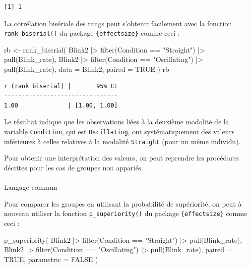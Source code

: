 \documentclass[
  letterpaper,
]{book}
\makeatletter
\let\oldparagraph\paragraph
\renewcommand{\paragraph}{
    \@ifstar
      \xxxParagraphStar
      \xxxParagraphNoStar
  }
\newcommand{\xxxParagraphStar}[1]{\oldparagraph*{#1}\mbox{}}
\newcommand{\xxxParagraphNoStar}[1]{\oldparagraph{#1}\mbox{}}
\newenvironment{Shaded}{\begin{snugshade}}{\end{snugshade}}
\newcommand{\AttributeTok}[1]{\textcolor[rgb]{0.40,0.45,0.13}{#1}}
\newcommand{\ConstantTok}[1]{\textcolor[rgb]{0.56,0.35,0.01}{#1}}
\newcommand{\FunctionTok}[1]{\textcolor[rgb]{0.28,0.35,0.67}{#1}}
\newcommand{\NormalTok}[1]{\textcolor[rgb]{0.00,0.23,0.31}{#1}}
\newcommand{\OtherTok}[1]{\textcolor[rgb]{0.00,0.23,0.31}{#1}}
\newcommand{\SpecialCharTok}[1]{\textcolor[rgb]{0.37,0.37,0.37}{#1}}
\newcommand{\StringTok}[1]{\textcolor[rgb]{0.13,0.47,0.30}{#1}}
\makeatother
\begin{document}
\begin{verbatim}
[1] 1
\end{verbatim}

La corrélation bisériale des rangs peut s'obtenir facilement avec la
fonction \texttt{rank\_biserial()} du package \texttt{\{effectsize\}}
comme ceci :

\begin{Shaded}
\begin{Highlighting}[]
\NormalTok{rb }\OtherTok{\textless{}{-}}
  \FunctionTok{rank\_biserial}\NormalTok{(}
\NormalTok{  Blink2 }\SpecialCharTok{|\textgreater{}} \FunctionTok{filter}\NormalTok{(Condition }\SpecialCharTok{==} \StringTok{"Straight"}\NormalTok{) }\SpecialCharTok{|\textgreater{}} \FunctionTok{pull}\NormalTok{(Blink\_rate),}
\NormalTok{  Blink2 }\SpecialCharTok{|\textgreater{}} \FunctionTok{filter}\NormalTok{(Condition }\SpecialCharTok{==} \StringTok{"Oscillating"}\NormalTok{) }\SpecialCharTok{|\textgreater{}} \FunctionTok{pull}\NormalTok{(Blink\_rate),}
  \AttributeTok{data =}\NormalTok{ Blink2,}
  \AttributeTok{paired =} \ConstantTok{TRUE}
\NormalTok{  )}
\NormalTok{rb}
\end{Highlighting}
\end{Shaded}

\begin{verbatim}
r (rank biserial) |       95% CI
--------------------------------
1.00              | [1.00, 1.00]
\end{verbatim}

Le résultat indique que les observations liées à la deuxième modalité de
la variable \texttt{Condition}, qui est \texttt{Oscillating}, ont
systématiquement des valeurs inférieures à celles relatives à la
modalité \texttt{Straight} (pour un même individu).

Pour obtenir une interprétation des valeurs, on peut reprendre les
procédures décrites pour les cas de groupes non appariés.

\paragraph{Langage commun}\label{langage-commun-2}

Pour comparer les groupes en utilisant la probabilité de supériorité, on
peut à nouveau utiliser la fonction \texttt{p\_superiority()} du package
\texttt{\{effectsize\}} comme ceci :

\begin{Shaded}
\begin{Highlighting}[]
\FunctionTok{p\_superiority}\NormalTok{(}
\NormalTok{  Blink2 }\SpecialCharTok{|\textgreater{}} \FunctionTok{filter}\NormalTok{(Condition }\SpecialCharTok{==} \StringTok{"Straight"}\NormalTok{) }\SpecialCharTok{|\textgreater{}} \FunctionTok{pull}\NormalTok{(Blink\_rate),}
\NormalTok{  Blink2 }\SpecialCharTok{|\textgreater{}} \FunctionTok{filter}\NormalTok{(Condition }\SpecialCharTok{==} \StringTok{"Oscillating"}\NormalTok{) }\SpecialCharTok{|\textgreater{}} \FunctionTok{pull}\NormalTok{(Blink\_rate),}
  \AttributeTok{paired =} \ConstantTok{TRUE}\NormalTok{,}
  \AttributeTok{parametric =} \ConstantTok{FALSE}
\NormalTok{)}
\end{Highlighting}
\end{Shaded}
\end{document}
